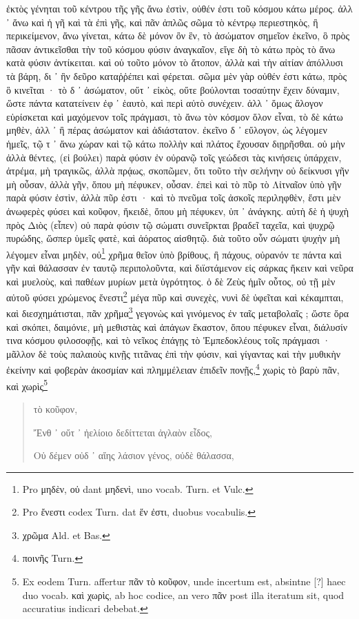 \documentclass[a4paper, 11pt, oneside, polutonikogreek, german]{article}
\begin{document}
ἐκτὸς γένηται τοῦ κέντρου τῆς γῆς ἄνω ἐστὶν, οὐθέν ἐστι τοῦ κόσμου κάτω μέρος. ἀλλ ᾽ ἄνω καὶ ἡ γῆ καὶ τὰ ἐπὶ γῆς, καὶ πᾶν ἁπλῶς σῶμα τὸ κέντρῳ περιεστηκὸς, ἢ περικείμενον, ἄνω γίνεται, κάτω δὲ μόνον ὂν ἓν, τὸ ἀσώματον σημεῖον ἐκεῖνο, ὃ πρὸς πᾶσαν ἀντικεῖσθαι τὴν τοῦ κόσμου φύσιν ἀναγκαῖον, εἴγε δὴ τὸ κάτω πρὸς τὸ ἄνω κατὰ φύσιν ἀντίκειται. καὶ οὐ τοῦτο μόνον τὸ ἄτοπον, ἀλλὰ καὶ τὴν αἰτίαν ἀπόλλυσι τὰ βάρη, δι ᾽ ἣν δεῦρο καταῤῥέπει καὶ φέρεται. σῶμα μὲν γὰρ οὐθέν ἐστι κάτω, πρὸς ὃ κινεῖται · τὸ δ ᾽ ἀσώματον, οὔτ ᾽ εἰκὸς, οὔτε βούλονται τοσαύτην ἔχειν δύναμιν, ὥστε πάντα κατατείνειν ἐφ ᾽ ἑαυτὸ, καὶ περὶ αὐτὸ συνέχειν. ἀλλ ᾽ ὅμως ἄλογον εὑρίσκεται καὶ μαχόμενον τοῖς πράγμασι, τὸ ἄνω τὸν κόσμον ὅλον εἶναι, τὸ δὲ κάτω μηθὲν, ἀλλ ᾽ ἢ πέρας ἀσώματον καὶ ἀδιάστατον. ἐκεῖνο δ ᾽ εὔλογον, ὡς λέγομεν ἡμεῖς, τῷ τ ᾽ ἄνω χώραν καὶ τῷ κάτω πολλὴν καὶ πλάτος ἔχουσαν διῃρῆσθαι. οὐ μὴν ἀλλὰ θέντες, (εἰ βούλει) παρὰ φύσιν ἐν οὐρανῷ τοῖς γεώδεσι τὰς κινήσεις ὑπάρχειν, ἀτρέμα, μὴ τραγικῶς, ἀλλὰ πρᾴως, σκοπῶμεν, ὅτι τοῦτο τὴν σελήνην οὐ δείκνυσι γῆν μὴ οὖσαν, ἀλλὰ γῆν, ὅπου μὴ πέφυκεν, οὖσαν. ἐπεὶ καὶ τὸ πῦρ τὸ Λἰτναῖον ὑπὸ γῆν παρὰ φύσιν ἐστὶν, ἀλλὰ πῦρ ἐστι · καὶ τὸ πνεῦμα τοῖς ἀσκοῖς περιληφθὲν, ἔστι μὲν ἀνωφερὲς φύσει καὶ κοῦφον, ἥκειδὲ, ὅπου μὴ πέφυκεν, ὑπ ᾽ ἀνάγκης. αὐτὴ δὲ ἡ ψυχὴ πρὸς Διὸς (εἶπεν) οὐ παρὰ φύσιν τῷ σώματι συνεῖρκται βραδεῖ ταχεῖα, καὶ ψυχρῷ πυρώδης, ὥσπερ ὑμεῖς φατὲ, καὶ ἀόρατος αἰσθητῷ. διὰ τοῦτο οὖν σώματι ψυχὴν μὴ λέγομεν εἶναι μηδὲν, οὐ\footnote{Pro μηδὲν, οὐ dant μηδενὶ, uno vocab. Turn. et Vulc.} χρῆμα θεῖον ὑπὸ βρίθους, ἢ πάχους, οὐρανόν τε πάντα καὶ γῆν καὶ θάλασσαν ἐν ταυτῷ περιπολοῦντα, καὶ διϊστάμενον εἰς σάρκας ἥκειν καὶ νεῦρα καὶ μυελοὺς, καὶ παθέων μυρίων μετὰ ὑγρότητος. ὁ δὲ Ζεὺς ἡμῖν οὗτος, οὐ τῇ μὲν αὐτοῦ φύσει χρώμενος ἔνεστι\footnote{Pro ἔνεστι codex Turn. dat ἕν ἐστι, duobus vocabulis.} μέγα πῦρ καὶ συνεχὲς, νυνὶ δὲ ὑφεῖται καὶ κέκαμπται, καὶ διεσχημάτισται, πᾶν χρῆμα\footnote{χρῶμα Ald. et Bas.} γεγονὼς καὶ γινόμενος ἐν ταῖς μεταβολαῖς ; ὥστε ὅρα καὶ σκόπει, δαιμόνιε, μὴ μεθιστὰς καὶ ἀπάγων ἕκαστον, ὅπου πέφυκεν εἶναι, διάλυσίν τινα κόσμου φιλοσοφῇς, καὶ τὸ νεῖκος ἐπάγῃς τὸ Ἐμπεδοκλέους τοῖς πράγμασι · μᾶλλον δὲ τοὺς παλαιοὺς κινῇς τιτᾶνας ἐπὶ τὴν φύσιν, καὶ γίγαντας καὶ τὴν μυθικὴν ἐκείνην καὶ φοβερὰν ἀκοσμίαν καὶ πλημμέλειαν ἐπιδεῖν πονῇς,\footnote{ποινῆς Turn.} χωρὶς τὸ βαρὺ πᾶν, καὶ χωρὶς\footnote{Ex eodem Turn. affertur πᾶν τὸ κοῦφον, unde incertum est, absintne [?] haec duo vocab. καὶ χωρὶς, ab hoc codice, an vero πᾶν post illa iteratum sit, quod accuratius indicari debebat.}
\begin{quotation}
τὸ κοῦφον,

Ἔνθ ᾽ οὔτ ᾽ ἠελίοιο δεδίττεται ἀγλαὸν εἶδος,

Οὐ δέμεν οὐδ ᾽ αἴης λάσιον γένος, οὐδὲ θάλασσα,
\end{quotation}
\end{document}

